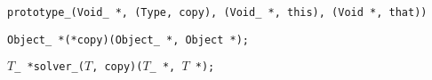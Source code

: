 
\tt{prototype_(Void_ *, (Type, copy), (Void_ *, this), (Void *, that))}


\tt{Object_ *(*copy)(Object_ *, Object *);}


$T$\tt{_ *solver_(}$T$\tt{, copy)(}$T$\tt{_ *,} $T$ \tt{*);}
